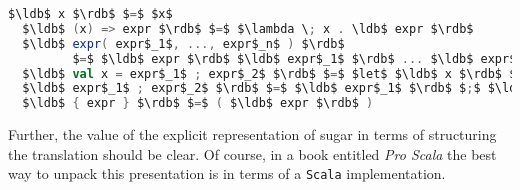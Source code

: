 
\begin{lstlisting}[language=Scala,mathescape=true,frame=single,caption={translating concrete to abstract syntax},captionpos=b]
  $\ldb$ x $\rdb$ $=$ $x$
  $\ldb$ (x) => expr $\rdb$ $=$ $\lambda \; x . \ldb$ expr $\rdb$ 
  $\ldb$ expr( expr$_1$, ..., expr$_n$ ) $\rdb$
         $=$ $\ldb$ expr $\rdb$ $\ldb$ expr$_1$ $\rdb$ ... $\ldb$ expr$_n$ $\rdb$
  $\ldb$ val x = expr$_1$ ; expr$_2$ $\rdb$ $=$ $let$ $\ldb$ x $\rdb$ $=$ $\ldb$ expr$_1$ $\rdb$ $in$ $\ldb$ expr$_2$ $\rdb$
  $\ldb$ expr$_1$ ; expr$_2$ $\rdb$ $=$ $\ldb$ expr$_1$ $\rdb$ $;$ $\ldb$ expr$_2$ $\rdb$
  $\ldb$ { expr } $\rdb$ $=$ ( $\ldb$ expr $\rdb$ )
\end{lstlisting}

Further, the value of the explicit representation of sugar in terms of
structuring the translation should be clear. Of course, in a book
entitled \emph{Pro Scala} the best way to unpack this presentation
is in terms of a \texttt{Scala} implementation.


